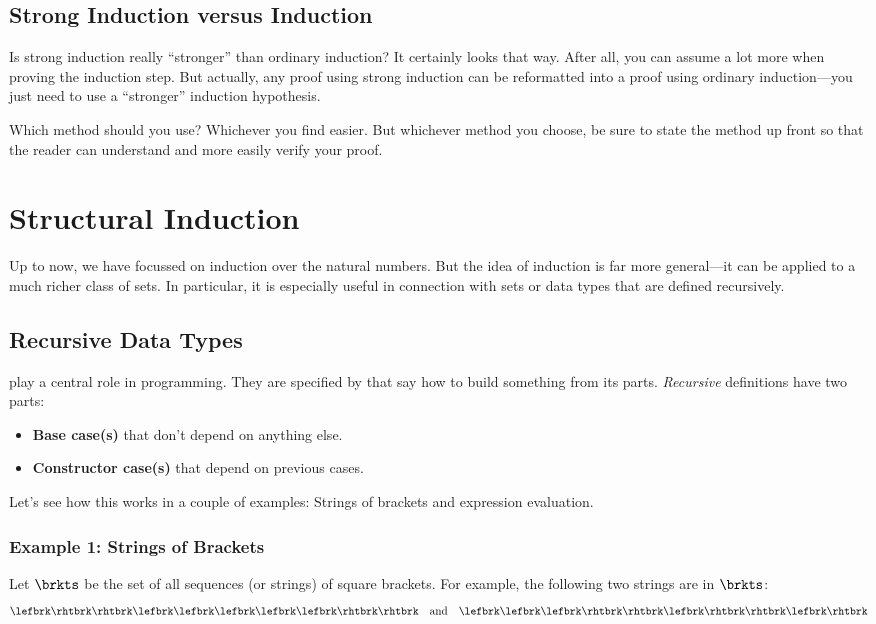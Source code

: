 \subsection{Strong Induction versus Induction} 

Is strong induction really ``stronger'' than ordinary induction?  It
certainly looks that way.  After all, you can assume a lot more when
proving the induction step.  But actually, any proof using
strong induction can be reformatted into a proof using ordinary
induction---you
just need to use a ``stronger'' induction hypothesis.

Which method should you use?  Whichever you find easier.  But
whichever method you choose, be sure to state the method up front so
that the reader can understand and more easily verify your proof.

\section{Structural Induction}

Up to now, we have focussed on induction over the natural numbers.
But the idea of induction is far more general---it can be applied to a
much richer class of sets.  In particular, it is especially useful in
connection with sets or data types that are defined recursively.

\subsection{Recursive Data Types}

 play a central role in programming.  They
are specified by 
that say how to build something from its parts.  \emph{Recursive}
definitions have two parts:
\begin{itemize}
\item \textbf{Base case(s)} that don't depend on anything else.
\item \textbf{Constructor case(s)} that depend on previous cases.
\end{itemize}
Let's see how this works in a couple of examples: Strings of brackets
and expression evaluation.

\subsubsection{Example 1: Strings of Brackets}

Let $\brkts$ be the set of all sequences (or strings) of square
brackets.  For example,
the following two strings are in $\brkts$:
\begin{equation}\label{2strings}
\lefbrk\rhtbrk\rhtbrk\lefbrk\lefbrk\lefbrk\lefbrk\lefbrk\rhtbrk\rhtbrk\quad \text{and}\quad \lefbrk\lefbrk\lefbrk\rhtbrk\rhtbrk\lefbrk\rhtbrk\rhtbrk\lefbrk\rhtbrk
\end{equation}

